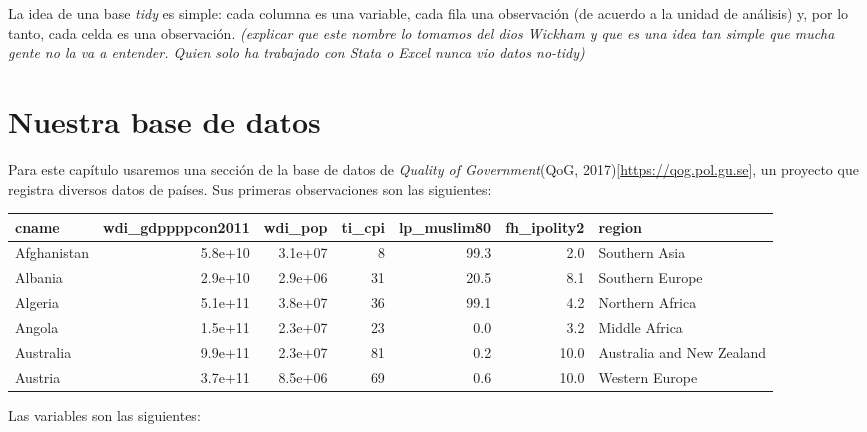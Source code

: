 \documentclass[]{book}
\begin{document}
La idea de una base \emph{tidy} es simple: cada columna es una variable,
cada fila una observación (de acuerdo a la unidad de análisis) y, por lo
tanto, cada celda es una observación. \emph{(explicar que este nombre lo
tomamos del dios Wickham y que es una idea tan simple que mucha gente no
la va a entender. Quien solo ha trabajado con Stata o Excel nunca vio
datos no-tidy)}

\hypertarget{nuestra-base-de-datos}{%
\section{Nuestra base de datos}\label{nuestra-base-de-datos}}

Para este capítulo usaremos una sección de la base de datos de
\emph{Quality of Government}(QoG,
2017){[}\url{https://qog.pol.gu.se}{]}, un proyecto que registra
diversos datos de países. Sus primeras observaciones son las siguientes:

\begin{tabular}{l|r|r|r|r|r|l}
\hline
cname & wdi\_gdppppcon2011 & wdi\_pop & ti\_cpi & lp\_muslim80 & fh\_ipolity2 & region\\
\hline
Afghanistan & 5.8e+10 & 3.1e+07 & 8 & 99.3 & 2.0 & Southern Asia\\
\hline
Albania & 2.9e+10 & 2.9e+06 & 31 & 20.5 & 8.1 & Southern Europe\\
\hline
Algeria & 5.1e+11 & 3.8e+07 & 36 & 99.1 & 4.2 & Northern Africa\\
\hline
Angola & 1.5e+11 & 2.3e+07 & 23 & 0.0 & 3.2 & Middle Africa\\
\hline
Australia & 9.9e+11 & 2.3e+07 & 81 & 0.2 & 10.0 & Australia and New Zealand\\
\hline
Austria & 3.7e+11 & 8.5e+06 & 69 & 0.6 & 10.0 & Western Europe\\
\hline
\end{tabular}

Las variables son las siguientes:
\end{document}
